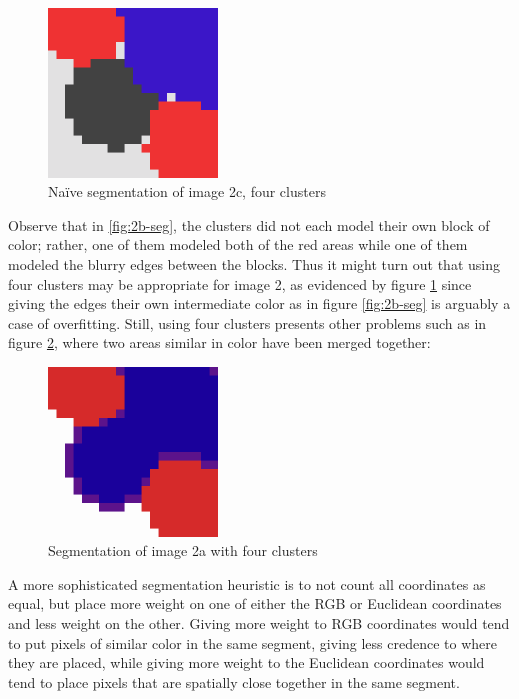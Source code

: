 \documentclass[letterpaper, 10pt, twocolumn]{article}
\numberwithin{theorem}{section}
\begin{document}
\begin{figure}[h]
	\centering
	\includegraphics[width=0.4\textwidth]{2c-seg-4clus}
	\caption{Naïve segmentation of image 2c, four clusters}
	\label{fig:2c-seg}
\end{figure}

Observe that in \ref{fig:2b-seg}, the clusters did not each model their own block of color; rather, one of them modeled both of the red areas while one of them modeled the blurry edges between the blocks.
Thus it might turn out that using four clusters may be appropriate for image 2, as evidenced by figure \ref{fig:2c-seg} since giving the edges their own intermediate color as in figure \ref{fig:2b-seg} is arguably a case of overfitting.
Still, using four clusters presents other problems such as in figure \ref{fig:2a-seg2}, where two areas similar in color have been merged together:

\begin{figure}[h]
	\centering
	\includegraphics[width=0.4\textwidth]{2a-seg2}
	\caption{Segmentation of image 2a with four clusters}
	\label{fig:2a-seg2}
\end{figure}

A more sophisticated segmentation heuristic is to not count all coordinates as equal, but place more weight on one of either the RGB or Euclidean coordinates and less weight on the other. 
Giving more weight to RGB coordinates would tend to put pixels of similar color in the same segment, giving less credence to where they are placed, while giving more weight to the Euclidean coordinates would tend to place pixels that are spatially close together in the same segment.
\end{document}
